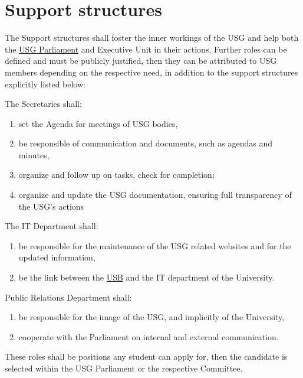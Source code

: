 	\section{Support structures} 
	\label{suppstrucdef}
	The Support structures shall foster the inner workings of the USG and help both the \hyperref[USGParliamentDef]{USG Parliament} and Executive Unit in their actions. Further roles can be defined and must be publicly justified, then they can be attributed to USG members depending on the respective need, in addition to the support structures explicitly listed below:
	\begin{parenum}
		\item The Secretaries shall:
		\begin{enumerate}
			\item set the Agenda for meetings of USG bodies,
			\item be responsible of communication and documents, such as agendas and minutes,
			\item organize and follow up on tasks, check for completion;
			\item organize and update the USG documentation, ensuring full transparency of the USG's actions
		\end{enumerate}
		
		\item The IT Department shall:
		\begin{enumerate}
			\item be responsible for the maintenance of the USG related websites and for the updated information,
			\item be the link between the \hyperref[studentbody]{USB} and the IT department of the University.
		\end{enumerate}
		
		\item Public Relations Department shall:
		\begin{enumerate}
			\item be responsible for the image of the USG, and implicitly of the University, 
			\item cooperate with the Parliament on internal and external communication.
		\end{enumerate}
	\end{parenum}
	These roles shall be positions any student can apply for, then the candidate is selected within the USG Parliament or the respective Committee.
	
